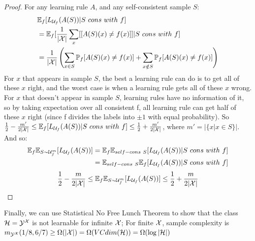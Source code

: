 \documentclass{article}
\begin{document}
\begin{proof}
	For any learning rule $A$, and any self-consistent sample $S$:
	\begin{displaymath}
  	\begin{aligned}
  		{} & \mathbb{E}_f[L_{\mathcal{U}_f}(A(S))| S\ cons\ with\ f] \\
  		& =\mathbb{E}_f[\frac{1}{|\mathcal{X}|}\sum_x[[A(S)(x)\neq f(x)]]| S\ cons\ with\ f] \\
  		& = \frac{1}{|\mathcal{X}|}\left(\sum_{x\in S}\mathbb{P}_f[A(S)(x)\neq f(x)]+\sum_{x\notin S}\mathbb{P}_f[A(S)(x)\neq f(x)]\right)
  	\end{aligned}
	\end{displaymath}
	For $x$ that appears in sample $S$, the best a learning rule can do is to get all of these $x$ right, and the worst case is when a learning rule gets all of these $x$ wrong. For $x$ that doesn't appear in sample $S$, learning rules have no information of it, so by taking expectation over all consistent f, all learning rule can get half of these $x$ right (since f divides the labels into $\pm1$ with equal probability). So $\frac{1}{2}-\frac{m'}{2|\mathcal{X}|}\leq \mathbb{E}_f[L_{\mathcal{U}_f}(A(S))| S\ cons\ with\ f] \leq \frac{1}{2}+\frac{m'}{2|\mathcal{X}|}$, where $m'=|\{x|x\in S\}|$. And so:
	\begin{displaymath}
  	\begin{aligned}
  		\mathbb{E}_f\mathbb{E}_{S\sim \mcU^m_f}[L_{\mcU_f}(A(S))] {} & =\mathbb{E}_f\mathbb{E}_{self-cons\ S}[L_{\mcU_f}(A(S))| S\ cons\ with\ f] \\
  		& =\mathbb{E}_{self-cons\ S}\mathbb{E}_f[L_{\mcU_f}(A(S))| S\ cons\ with\ f] \\
  	\end{aligned}
	\end{displaymath}
	\begin{displaymath}
  		\frac{1}{2}-\frac{m}{2|\mathcal{X}|}\leq \mathbb{E}_f\mathbb{E}_{S\sim \mathcal{U}^m_f}[L_{\mathcal{U}_f}(A(S))]\leq \frac{1}{2}+\frac{m}{2|\mathcal{X}|}
	\end{displaymath}
\end{proof}
Finally, we can use Statistical No Free Lunch Theorem to show that the class $\mathcal{H}=\mathcal{Y}^{\mathcal{X}}$ is not learnable for infinite $\mathcal{X}$; For finite $\mathcal{X}$, sample complexity is $m_{\mathcal{Y}^{\mathcal{X}}}(1/8, 6/7)\geq \Omega(|\mathcal{X}|)=\Omega(VCdim(\mathcal{H}))=\Omega(\log{|\mathcal{H}|})$
\end{document}

